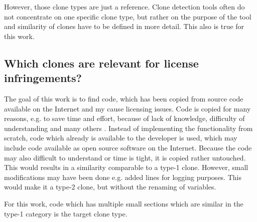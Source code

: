However, those clone types are just a reference.
Clone detection tools often do not concentrate on one specific clone type, but rather on the purpose of the tool and similarity of clones have to be defined in more detail.
This also is true for this work.
 
\subsection*{Which clones are relevant for license infringements?}
The goal of this work is to find code, which has been copied from source code available on the Internet and my cause licensing issues.
Code is copied for many reasons, e.g. to save time and effort, because of lack of knowledge, difficulty of understanding and many others \cite{roy2007survey}.
Instead of implementing the functionality from scratch, code which already is available to the developer is used, which may include code available as open source software on the Internet.
Because the code may also difficult to understand or time is tight, it is copied rather untouched.
This would results in a similarity comparable to a type-1 clone.
However, small modifications may have been done e.g. added lines for logging purposes.
This would make it a type-2 clone, but without the renaming of variables.

For this work, code which has multiple small sections which are similar in the type-1 category is the target clone type.